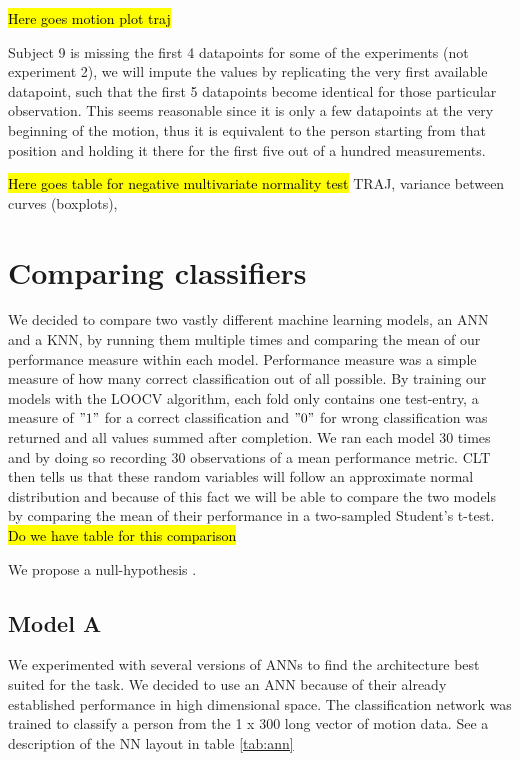 \documentclass{article}
\begin{document}
\hl{Here goes motion plot traj}

Subject 9 is missing the first 4 datapoints for some of the experiments (not experiment 2), we will impute the values by replicating the very first available datapoint, such that the first 5 datapoints become identical for those particular observation. This seems reasonable since it is only a few datapoints at the very beginning of the motion, thus it is equivalent to the person starting from that position and holding it there for the first five out of a hundred measurements.

\hl{Here goes table for negative multivariate normality test}
TRAJ, variance between curves (boxplots), 

\section{Comparing classifiers}
We decided to compare two vastly different machine learning models, an ANN and a KNN, by running them multiple times and comparing the mean of our performance measure within each model. Performance measure was a simple measure of how many correct classification out of all possible. By training our models with the LOOCV algorithm, each fold only contains one test-entry, a measure of $"1"$ for a correct classification and $"0"$ for wrong classification was returned and all values summed after completion. We ran each model 30 times and by doing so recording 30 observations of a mean performance metric. CLT then tells us that these random variables will follow an approximate normal distribution and because of this fact we will be able to compare the two models by comparing the mean of their performance in a two-sampled Student's t-test.\\

\hl{Do we have table for this comparison}

We propose a null-hypothesis . 
\subsection{Model A}
We experimented with several versions of ANNs to find the architecture best suited for the task. We decided to use an ANN because of their already established performance in high dimensional space. The classification network was trained to classify a person from the 1 x 300 long vector of motion data. See a description of the NN layout in table \ref{tab:ann} 
\end{document}

